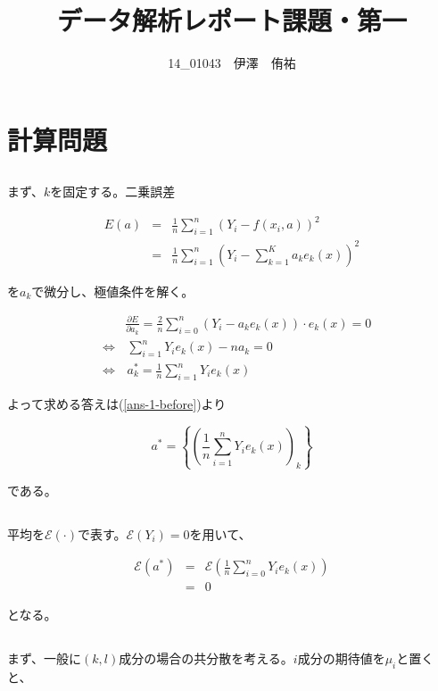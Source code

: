 \documentclass[a4paper,xelatex,ja=standard,jafont=hiragino-pron, 10pt]{bxjsarticle}
\title{データ解析レポート課題・第一}
\author{14\_01043　伊澤　侑祐}
\date{}
\begin{document}
\maketitle
\section{計算問題}
\subsection{}
まず、$k$を固定する。二乗誤差

\begin{eqnarray}
  E(a) &=& \frac{1}{n} \sum_{i = 1}^n (Y_i - f(x_i, a))^2 \nonumber \\
       &=& \frac{1}{n} \sum_{i = 1}^n (Y_i - \sum_{k = 1}^K a_k e_k(x))^2
\end{eqnarray}

を$a_k$で微分し、極値条件を解く。

\begin{eqnarray}
  &&\frac{\partial E}{\partial a_k}
    = \frac{2}{n} \sum_{i = 0}^n (Y_i - a_ke_k(x)) \cdot e_k(x) = 0 \nonumber \\
    &\Longleftrightarrow& \, \sum_{i=1}^n Y_i e_k(x) - n a_k = 0 \nonumber \\
    &\Longleftrightarrow& \, a^*_k = \frac{1}{n} \sum_{i=1}^n Y_i e_k(x)
    \label{ans-1-before}
\end{eqnarray}

よって求める答えは(\ref{ans-1-before})より

\begin{equation}
  a^* = \left\{ \left(\frac{1}{n} \sum_{i=1}^n Y_i e_k(x)\right)_k \right\}
\end{equation}

である。

\subsection{}
平均を$\mathscr{E}(\cdot)$で表す。$\mathscr{E}(Y_i) = 0$を用いて、

\begin{eqnarray}
  \mathscr{E}(a^*)
    &=& \mathscr{E} \left(\frac{1}{n}\sum_{i=0}^n Y_i e_k (x) \right) \nonumber \\
    &=& 0
\end{eqnarray}

となる。
\subsection{}
まず、一般に$(k, l)$成分の場合の共分散を考える。$i$成分の期待値を$\mu_i$と置くと、
\end{document}
